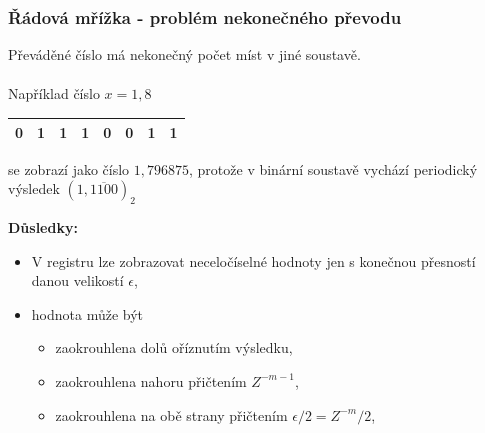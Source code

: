   \begin{frame}
    \frametitle{Řádová mřížka - problém nekonečného převodu}
		
		\begin{minipage}[t][0.4\textheight][t]{\textwidth}
      \boldmath
			\small
      Převáděné číslo má nekonečný počet míst v jiné soustavě. \\ \\
			Například číslo $x=1,8$
      \begin{center}
        \begin{tabular}{| p{5mm} | p{5mm} || p{5mm} | p{5mm} | p{5mm} | p{5mm} | p{5mm} | p{5mm} |}
				 \hline
          0 & 1 & 1 & 1 & 0 & 0 & 1 & 1 \\
         \hline
        \end{tabular}
      \end{center} 
			se zobrazí jako číslo $1,796875$, protože v binární soustavě vychází periodický výsledek $(1,\overline{1100})_2$
		\end{minipage}
    
		\begin{minipage}[t][0.5\textheight][t]{\textwidth}
		\boldmath
		\small
		\textbf{Důsledky:}
      \begin{itemize}
        \item V registru lze zobrazovat neceločíselné hodnoty jen s konečnou přesností danou velikostí $\epsilon$,
				\item hodnota může být
				
				\begin{itemize}
					\item zaokrouhlena dolů oříznutím výsledku,
					\item zaokrouhlena nahoru přičtením $Z^{-m-1}$,
					\item zaokrouhlena na obě strany přičtením $\epsilon/2 = Z^{-m}/2$,
				\end{itemize}
				
      \end{itemize}
		\end{minipage}
		
	\end{frame}
	
